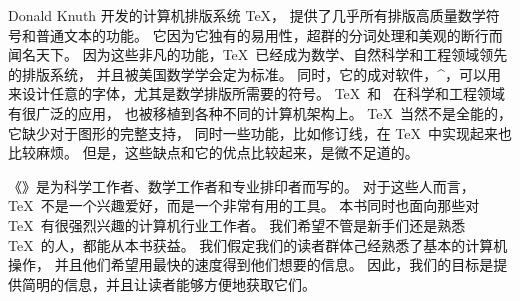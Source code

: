 


Donald Knuth 开发的计算机排版系统 \TeX ，
提供了几乎所有排版高质量数学符号和普通文本的功能。
它因为它独有的易用性，超群的分词处理和美观的断行而闻名天下。
因为这些非凡的功能，\TeX\ 已经成为数学、自然科学和工程领域领先的排版系统，
并且被美国数学学会定为标准。
同时，它的成对软件，^{\Metafont}，可以用来设计任意的字体，尤其是数学排版所需要的符号。
\TeX\ 和 \Metafont\ 在科学和工程领域有很广泛的应用，
也被移植到各种不同的计算机架构上。
\TeX\ 当然不是全能的，它缺少对于图形的完整支持，
同时一些功能，比如修订线，在 \TeX\ 中实现起来也比较麻烦。
但是，这些缺点和它的优点比较起来，是微不足道的。

《\thisbook 》是为科学工作者、数学工作者和专业排印者而写的。
对于这些人而言，\TeX\ 不是一个兴趣爱好，而是一个非常有用的工具。
本书同时也面向那些对 \TeX\ 有很强烈兴趣的计算机行业工作者。
我们希望不管是新手们还是熟悉 \TeX\ 的人，都能从本书获益。
我们假定我们的读者群体己经熟悉了基本的计算机操作，
并且他们希望用最快的速度得到他们想要的信息。
因此，我们的目标是提供简明的信息，并且让读者能够方便地获取它们。

